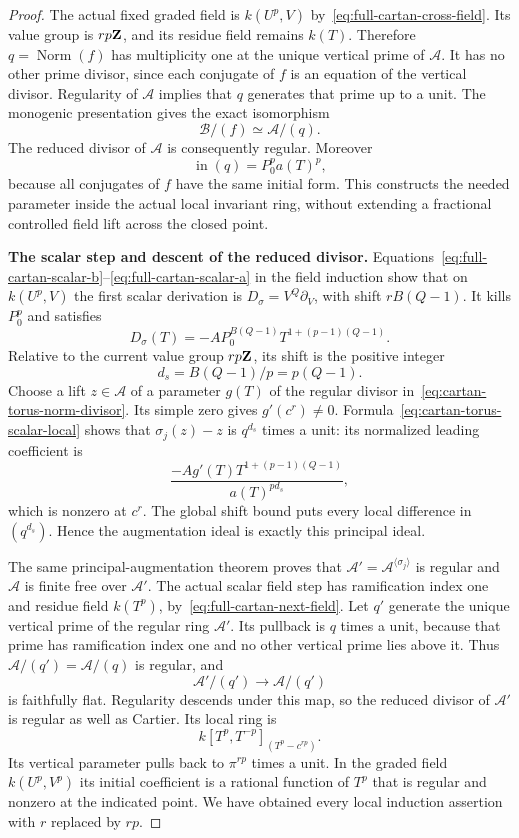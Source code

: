 \begin{proof}
The actual fixed graded field is $k(U^p,V)$ by~\eqref{eq:full-cartan-cross-field}. Its value group is $rp\mathbf Z$, and its residue field remains $k(T)$. Therefore $q=\operatorname{Norm}(f)$ has multiplicity one at the unique vertical prime of $\mathcal A$. It has no other prime divisor, since each conjugate of $f$ is an equation of the vertical divisor. Regularity of $\mathcal A$ implies that $q$ generates that prime up to a unit. The monogenic presentation gives the exact isomorphism
\begin{equation}\label{eq:cartan-torus-norm-divisor}
 \mathcal B/(f)\simeq\mathcal A/(q).
\end{equation}
The reduced divisor of $\mathcal A$ is consequently regular. Moreover
\[
 \operatorname{in}(q)=P_0^p a(T)^p,
\]
because all conjugates of $f$ have the same initial form. This constructs the needed parameter inside the actual local invariant ring, without extending a fractional controlled field lift across the closed point.

\par\medskip\noindent\textbf{The scalar step and descent of the reduced divisor.}\enspace
Equations~\eqref{eq:full-cartan-scalar-b}--\eqref{eq:full-cartan-scalar-a} in the field induction show that on $k(U^p,V)$ the first scalar derivation is $D_\sigma=V^Q\partial_V$, with shift $rB(Q-1)$. It kills $P_0^p$ and satisfies
\begin{equation}\label{eq:cartan-torus-scalar-local}
 D_\sigma(T)=-A P_0^{B(Q-1)}T^{1+(p-1)(Q-1)}.
\end{equation}
Relative to the current value group $rp\mathbf Z$, its shift is the positive integer
\[
 d_s=B(Q-1)/p=p(Q-1).
\]
Choose a lift $z\in\mathcal A$ of a parameter $g(T)$ of the regular divisor in~\eqref{eq:cartan-torus-norm-divisor}. Its simple zero gives $g'(c^r)\ne0$. Formula~\eqref{eq:cartan-torus-scalar-local} shows that $\sigma_j(z)-z$ is $q^{d_s}$ times a unit: its normalized leading coefficient is
\[
 \frac{-A g'(T)T^{1+(p-1)(Q-1)}}{a(T)^{p d_s}},
\]
which is nonzero at $c^r$. The global shift bound puts every local difference in $(q^{d_s})$. Hence the augmentation ideal is exactly this principal ideal.

The same principal-augmentation theorem proves that $\mathcal A'=\mathcal A^{\langle\sigma_j\rangle}$ is regular and $\mathcal A$ is finite free over $\mathcal A'$. The actual scalar field step has ramification index one and residue field $k(T^p)$, by~\eqref{eq:full-cartan-next-field}. Let $q'$ generate the unique vertical prime of the regular ring $\mathcal A'$. Its pullback is $q$ times a unit, because that prime has ramification index one and no other vertical prime lies above it. Thus $\mathcal A/(q')=\mathcal A/(q)$ is regular, and
\[
 \mathcal A'/(q')\longrightarrow\mathcal A/(q')
\]
is faithfully flat. Regularity descends under this map, so the reduced divisor of $\mathcal A'$ is regular as well as Cartier. Its local ring is
\[
 k[T^p,T^{-p}]_{(T^p-c^{rp})}.
\]
Its vertical parameter pulls back to $\pi^{rp}$ times a unit. In the graded field $k(U^p,V^p)$ its initial coefficient is a rational function of $T^p$ that is regular and nonzero at the indicated point. We have obtained every local induction assertion with $r$ replaced by $rp$.


\end{proof}
